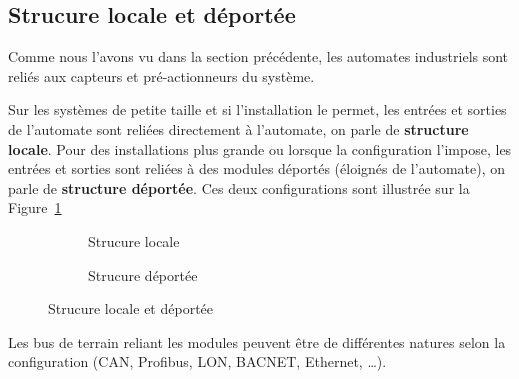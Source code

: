 \documentclass[11pt]{article}
\begin{document}
\subsection{Strucure locale et déportée}
Comme nous l'avons vu dans la section précédente, les automates industriels sont reliés aux capteurs et pré-actionneurs du système.

Sur les systèmes de petite taille et si l'installation le permet, les entrées et sorties de l'automate sont reliées directement à l'automate, on parle de \textbf{structure locale}. Pour des installations plus grande ou lorsque la configuration l'impose, les entrées et sorties sont reliées à des modules déportés (éloignés de l'automate), on parle de \textbf{structure déportée}. Ces deux configurations sont illustrée sur la Figure~\ref{fig:local_deporte}

\begin{figure}[h]
	\begin{subfigure}[b]{.49\textwidth}
		\centering
		
		\caption{Strucure locale}
	\end{subfigure}
	\begin{subfigure}[b]{.49\textwidth}
	\centering
	
	\caption{Strucure déportée}
	\end{subfigure}
	\caption{Strucure locale et déportée}
	\label{fig:local_deporte}
\end{figure}

Les bus de terrain reliant les modules peuvent être de différentes natures selon la configuration (CAN, Profibus, LON, BACNET, Ethernet, \dots).

\end{document}
